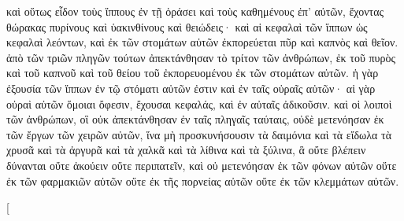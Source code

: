 \begin{pages}
\begin{Rightside}
		\pend
		\pstart
		καὶ οὕτως εἶδον τοὺς ἵππους ἐν τῇ ὁράσει καὶ τοὺς καθημένους ἐπ’ αὐτῶν, ἔχοντας θώρακας πυρίνους καὶ ὑακινθίνους καὶ θειώδεις· καὶ αἱ κεφαλαὶ τῶν ἵππων ὡς κεφαλαὶ λεόντων, καὶ ἐκ τῶν στομάτων αὐτῶν ἐκπορεύεται πῦρ καὶ καπνὸς καὶ θεῖον. 
		\pend
		\pstart
		ἀπὸ τῶν τριῶν πληγῶν τούτων ἀπεκτάνθησαν τὸ τρίτον τῶν ἀνθρώπων, ἐκ τοῦ πυρὸς καὶ τοῦ καπνοῦ καὶ τοῦ θείου τοῦ ἐκπορευομένου ἐκ τῶν στομάτων αὐτῶν. ἡ γὰρ ἐξουσία τῶν ἵππων ἐν τῷ στόματι αὐτῶν ἐστιν καὶ ἐν ταῖς οὐραῖς αὐτῶν· αἱ γὰρ οὐραὶ αὐτῶν ὅμοιαι ὄφεσιν, ἔχουσαι κεφαλάς, καὶ ἐν αὐταῖς ἀδικοῦσιν.
		\pend
		\pstart
		καὶ οἱ λοιποὶ τῶν ἀνθρώπων, οἳ οὐκ ἀπεκτάνθησαν ἐν ταῖς πληγαῖς ταύταις, οὐδὲ μετενόησαν ἐκ τῶν ἔργων τῶν χειρῶν αὐτῶν, ἵνα μὴ προσκυνήσουσιν τὰ δαιμόνια καὶ τὰ εἴδωλα τὰ χρυσᾶ καὶ τὰ ἀργυρᾶ καὶ τὰ χαλκᾶ καὶ τὰ λίθινα καὶ τὰ ξύλινα, ἃ οὔτε βλέπειν δύνανται οὔτε ἀκούειν οὔτε περιπατεῖν, καὶ οὐ μετενόησαν ἐκ τῶν φόνων αὐτῶν οὔτε ἐκ τῶν φαρμακιῶν αὐτῶν οὔτε ἐκ τῆς πορνείας αὐτῶν οὔτε ἐκ τῶν κλεμμάτων αὐτῶν.
		\pend
        \endnumbering
    \end{Rightside}
    \begin{Leftside}
        \beginnumbering
        \pstart[

\end{Leftside}
\end{pages}
